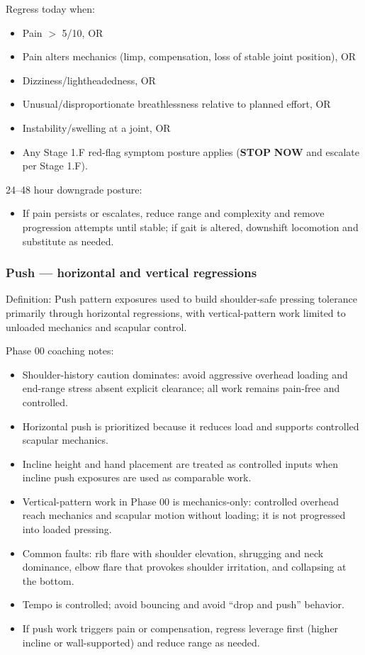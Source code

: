 \documentclass[10pt]{article}
\begin{document}
Regress today when:

\begin{itemize}
\item Pain $>$ 5/10, OR
\item Pain alters mechanics (limp, compensation, loss of stable joint position), OR
\item Dizziness/lightheadedness, OR
\item Unusual/disproportionate breathlessness relative to planned effort, OR
\item Instability/swelling at a joint, OR
\item Any Stage 1.F red-flag symptom posture applies (\textbf{STOP} \textbf{NOW} and escalate per Stage 1.F).
\end{itemize}

24–48 hour downgrade posture:

\begin{itemize}
\item If pain persists or escalates, reduce range and complexity and remove progression attempts until stable; if gait is altered, downshift locomotion and substitute as needed.
\end{itemize}

\subsubsection*{Push — horizontal and vertical regressions}

Definition: Push pattern exposures used to build shoulder-safe pressing tolerance primarily through horizontal regressions, with vertical-pattern work limited to unloaded mechanics and scapular control.

Phase 00 coaching notes:

\begin{itemize}
\item Shoulder-history caution dominates: avoid aggressive overhead loading and end-range stress absent explicit clearance; all work remains pain-free and controlled.
\item Horizontal push is prioritized because it reduces load and supports controlled scapular mechanics.
\item Incline height and hand placement are treated as controlled inputs when incline push exposures are used as comparable work.
\item Vertical-pattern work in Phase 00 is mechanics-only: controlled overhead reach mechanics and scapular motion without loading; it is not progressed into loaded pressing.
\item Common faults: rib flare with shoulder elevation, shrugging and neck dominance, elbow flare that provokes shoulder irritation, and collapsing at the bottom.
\item Tempo is controlled; avoid bouncing and avoid “drop and push” behavior.
\item If push work triggers pain or compensation, regress leverage first (higher incline or wall-supported) and reduce range as needed.
\end{itemize}
\end{document}
